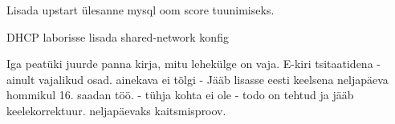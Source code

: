 Lisada upstart ülesanne mysql oom score tuunimiseks.


DHCP laborisse lisada shared-network konfig

Iga peatüki juurde panna kirja, mitu lehekülge on vaja.
E-kiri tsitaatidena - ainult vajalikud osad.
ainekava ei tõlgi - Jääb lisasse eesti keelsena
neljapäeva hommikul 16. saadan töö. - tühja kohta ei ole - todo on tehtud ja jääb keelekorrektuur.
neljapäevaks kaitsmisproov.

%
